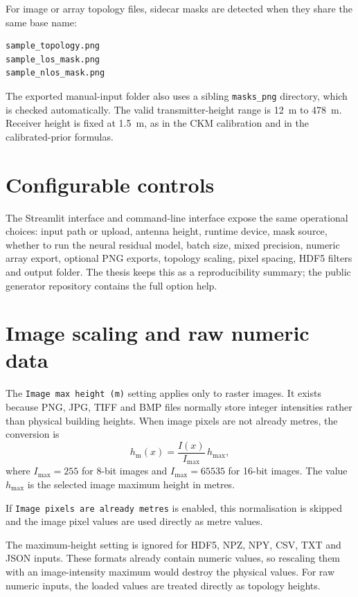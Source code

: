 For image or array topology files, sidecar masks are detected when they share
the same base name:

{\scriptsize
\begin{verbatim}
sample_topology.png
sample_los_mask.png
sample_nlos_mask.png
\end{verbatim}
}

The exported manual-input folder also uses a sibling \texttt{masks\_png}
directory, which is checked automatically. The valid transmitter-height range
is \SI{12}{m} to \SI{478}{m}. Receiver height is fixed at \SI{1.5}{m}, as in
the CKM calibration and in the calibrated-prior formulas.

\section{Configurable controls}

The Streamlit interface and command-line interface expose the same operational
choices: input path or upload, antenna height, runtime device, mask source,
whether to run the neural residual model, batch size, mixed precision, numeric
array export, optional PNG exports, topology scaling, pixel spacing, HDF5
filters and output folder. The thesis keeps this as a reproducibility summary;
the public generator repository contains the full option help.

\section{Image scaling and raw numeric data}

The \texttt{Image max height (m)} setting applies only to raster images. It
exists because PNG, JPG, TIFF and BMP files normally store integer intensities
rather than physical building heights. When image pixels are not already metres,
the conversion is
\begin{equation}
  h_{\mathrm{m}}(x) =
  \frac{I(x)}{I_{\max}}\,h_{\max},
\label{eq:generator_image_height_scaling}
\end{equation}
where \(I_{\max}=255\) for 8-bit images and \(I_{\max}=65535\) for 16-bit
images. The value \(h_{\max}\) is the selected image maximum height in metres.

If \texttt{Image pixels are already metres} is enabled, this normalisation is
skipped and the image pixel values are used directly as metre values.

The maximum-height setting is ignored for HDF5, NPZ, NPY, CSV, TXT and JSON
inputs. These formats already contain numeric values, so rescaling them with an
image-intensity maximum would destroy the physical values. For raw numeric
inputs, the loaded values are treated directly as topology heights.

